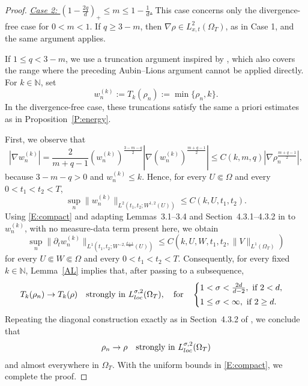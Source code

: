 \documentclass{amsart}
\numberwithin{equation}{section}
\begin{document}
\begin{proof}
\medskip 
\noindent
\underline{\emph{Case 2: $(1-\frac{2q}{d})_{+} \leq m \leq 1-\frac{1}{d}$.}}
This case concerns only the divergence-free case for $0<m<1$. If $q\geq 3-m$, then $\nabla\rho\in L^2_{x,t}(\Omega_T)$, as in Case 1, and the same argument applies.

If $1\le q<3-m$, we use a truncation argument inspired by \cites{BDG15, HKKP}, which also covers the range where the preceding Aubin--Lions argument cannot be applied directly. For $k\in\mathbb N$, set
\[
w_n^{(k)}:=T_k(\rho_n):=\min\{\rho_n,k\}.
\]
In the divergence-free case, these truncations satisfy the same a priori estimates as in Proposition~\ref{P:energy}.

First, we observe that 
\[
|\nabla w_n^{(k)}|
=
\frac{2}{m+q-1}\left(w_n^{(k)}\right)^{\frac{3-m-q}{2}}
\left|\nabla \left(w_n^{(k)}\right)^{\frac{m+q-1}{2}}\right|
\le
C(k,m,q)\left|\nabla \rho_n^{\frac{m+q-1}{2}}\right|,
\]
because $3-m-q>0$ and $w_n^{(k)}\le k$. Hence, for every $U\Subset\Omega$ and every $0<t_1<t_2<T$,
\begin{equation}\label{divfree-trunc-grad}
\sup_n \|w_n^{(k)}\|_{L^{2}(t_1,t_2;W^{1,2}(U))}\le C(k,U,t_1,t_2).
\end{equation}
Using \eqref{E:compact} and adapting Lemmas~3.1--3.4 and Section~4.3.1--4.3.2 in \cite{BDG15} to $w_n^{(k)}$, with no measure-data term present here, we obtain 
\begin{equation}\label{divfree-trunc-time}
\sup_n
\|\partial_t w_n^{(k)}\|_{L^1(t_1,t_2;W^{-2,\frac{d+1}{d}}(U))}
\le
C(k,U,W,t_1,t_2, \|V\|_{L^{1}(\Omega_T)})
\end{equation}
for every $U\Subset W\Subset\Omega$ and every $0<t_1<t_2<T$. 
Consequently, for every fixed $k\in\mathbb N$, Lemma~\ref{AL} implies that, after passing to a subsequence,
\[
T_k(\rho_n)\to T_k(\rho)
\quad \text{strongly in }L^{\sigma,2}_{\rm loc}(\Omega_T), \quad \text{for}\quad
\begin{cases}
	1<\sigma < \frac{2d}{d-2} , \text{ if } 2<d, \vspace{1mm}\\
	1\leq \sigma < \infty, \text{ if } 2 \geq d. 
\end{cases}
\]
Repeating the diagonal construction exactly as in Section~4.3.2 of \cite{BDG15}, we conclude that
\[
\rho_n\to \rho
\quad \text{strongly in }L^{\sigma,2}_{\rm loc}(\Omega_T)
\]
and almost everywhere in $\Omega_T$. With the uniform bounds in \eqref{E:compact}, we complete the proof. 
\end{proof}
\end{document}
